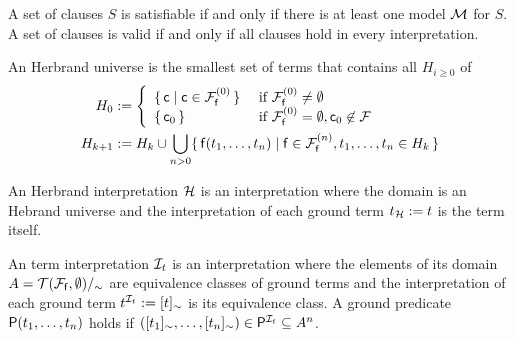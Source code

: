 \begin{definition}
	A set of clauses $S$ is {\myem satisfiable} if and only if there is at least one model ${\mathcal M}$ for $S$. 
	A set of clauses is  {\myem valid} if and only if all clauses hold in every interpretation.
\end{definition}

\begin{definition}\label{def:hk}
	An {\myem Herbrand universe} is the smallest set of terms that contains all $H_{i\geq 0}$ of
	\begin{align*}
	H_0 &:= \left\{ 
	\begin{array}{ll}
	\{\,\mc \mid \mc\in\mcFfn[0]\,\} 
	&\text{if } \mcFfn[0]\not=\emptyset\\
	\{\,\mc_0\,\}
	&\text{if } \mcFfn[0]=\emptyset, \mc_0\not\in\mcF
	\end{array}
	\right. 
	\\
	H_{k+1} &:= H_k \cup \bigcup_{n> 0} 
	\{\,  
	\mf(t_1,\ldots,t_n) \mid
	\mf\in\mcFfn[n],
	t_1,\ldots,t_n \in H_k
	\,\}
	\end{align*}
	
\end{definition}

\begin{definition}
	An {\myem Herbrand interpretation} ${\mathcal H}$ is an interpretation where the domain 
	is an Hebrand universe
	and the interpretation of each ground term $t_{\mathcal H} := t$ is the term itself.
\end{definition}


\begin{definition}
	An {\myem term interpretation} 
	${\mathcal I}_t$ 
	is an interpretation 
	where the elements of its domain $A = {{\mathcal T}({\mathcal F}_{\mathsf f},\emptyset)}/_\sim$ 
		are equivalence classes of ground terms
		and the interpretation of each ground term $t^{{\mathcal I}_t} := [t]_\sim$ is its equivalence class.
	 A ground predicate ${\mathsf P}(t_1,\ldots,t_n)$ holds if 
	 $([t_1]_\sim,\ldots,[t_n]_\sim) \in {\mathsf P}^{{\mathcal I}_t} \subseteq A^n$.
	
\end{definition}

